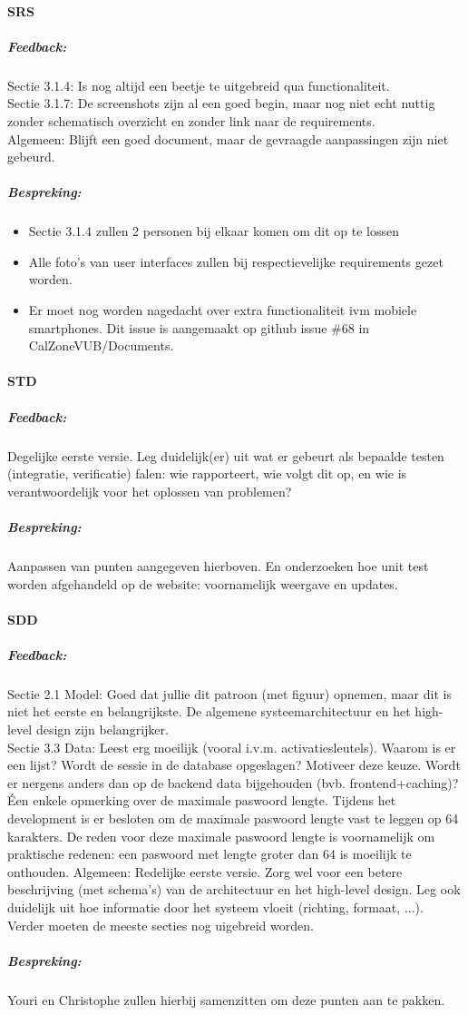 \paragraph{SRS}
\subparagraph{Feedback:}
Sectie 3.1.4: Is nog altijd een beetje te uitgebreid qua functionaliteit.
\\
Sectie 3.1.7: De screenshots zijn al een goed begin, maar nog niet echt nuttig zonder schematisch overzicht en zonder link naar de requirements.
\\
Algemeen: Blijft een goed document, maar de gevraagde aanpassingen zijn niet gebeurd.
\subparagraph{Bespreking:}

\begin{itemize}
	\item Sectie 3.1.4 zullen 2 personen bij elkaar komen om dit op te lossen
	\item Alle foto's van user interfaces zullen bij respectievelijke requirements gezet worden. 
	\item Er moet nog worden nagedacht over extra functionaliteit ivm mobiele smartphones. Dit issue is aangemaakt op github issue \#68 in CalZoneVUB/Documents.
\end{itemize}


\paragraph{STD}
\subparagraph{Feedback:}
Degelijke eerste versie.
Leg duidelijk(er) uit wat er gebeurt als bepaalde testen (integratie, verificatie) falen: wie rapporteert, wie volgt dit op, en wie is verantwoordelijk voor het oplossen van problemen?

\subparagraph{Bespreking:}
Aanpassen van punten aangegeven hierboven. En onderzoeken hoe unit test worden afgehandeld op de website: voornamelijk weergave en updates.

\paragraph{SDD}
\subparagraph{Feedback:}
Sectie 2.1 Model: Goed dat jullie dit patroon (met figuur) opnemen, maar dit is niet het eerste en belangrijkste.
De algemene systeemarchitectuur en het high-level design zijn belangrijker.
\\
Sectie 3.3 Data: Leest erg moeilijk (vooral i.v.m. activatiesleutels). Waarom is er een lijst?
Wordt de sessie in de database opgeslagen? Motiveer deze keuze.
Wordt er nergens anders dan op de backend data bijgehouden (bvb. frontend+caching)?
\\Éen enkele opmerking over de maximale paswoord lengte. Tijdens het development is er besloten om de maximale paswoord lengte vast te leggen op 64 karakters. De reden voor deze maximale paswoord lengte is voornamelijk om praktische redenen: een paswoord met lengte groter dan 64 is moeilijk te onthouden.
Algemeen: Redelijke eerste versie. Zorg wel voor een betere beschrijving (met schema's) van de architectuur en het high-level design.
Leg ook duidelijk uit hoe informatie door het systeem vloeit (richting, formaat, ...).
Verder moeten de meeste secties nog uigebreid worden.
\subparagraph{Bespreking:}
Youri en Christophe zullen hierbij samenzitten om deze punten aan te pakken.
 

